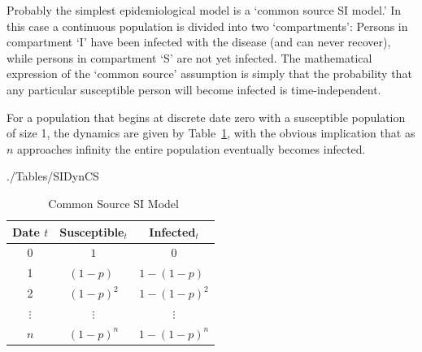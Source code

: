 Probably the simplest epidemiological model is a `common source SI model.'  In this case a continuous population is divided into two `compartments': Persons in compartment `I' have been infected with the disease (and can never recover), while persons in compartment `S' are not yet infected.  The mathematical expression of the `common source' assumption is simply that the probability that any particular susceptible person will become infected is time-independent.  %

For a population that begins at discrete date zero with a susceptible population of size 1, the dynamics are given by Table~\ref{table:SIDyn}, with the obvious implication that as $n$ approaches infinity the entire population eventually becomes infected.

\begin{verbatimwrite}{./Tables/SIDynCS}
  \begin{table}[ht]
    \centering
    \caption{ ~Common Source SI Model}\label{table:SIDyn} \medskip
    \begin{tabular}{ccc}
      \hline
      Date $t$ & Susceptible$_t$ & Infected$_t$ \\
      \hline
      0 & $1$  &  $0$ \\
      \hline
      1 & $(1-p)\phantom{^2}$ & $1-(1-p)\phantom{^2}$ \\
      \hline
      2 & $(1-p)^{2}$ & $1-(1-p)^{2}$ \\
      \hline
      $\vdots$ & $\vdots$ & $\vdots$ \\
      \hline
      $n$ & $(1-p)^{n}$ & $1-(1-p)^{n}$ \\
      \hline
    \end{tabular}
  \end{table}
\end{verbatimwrite}


